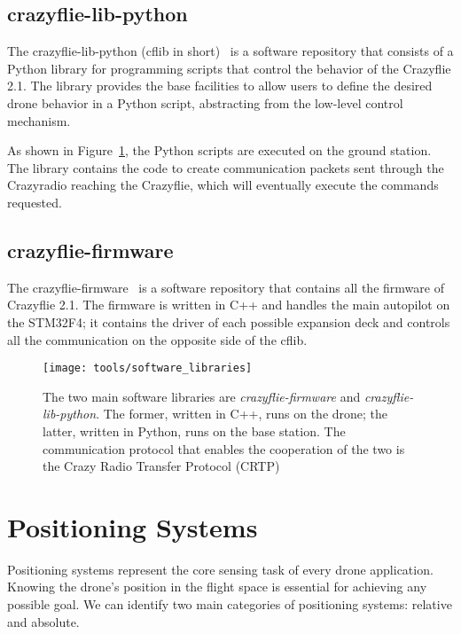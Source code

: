 \subsection{crazyflie-lib-python}\label{subsec:crazyflie_lib_python}
The crazyflie-lib-python (cflib in short)~\cite{crazyflie-lib-python} is a software repository that consists of a Python library for programming scripts that control the behavior of the Crazyflie 2.1.
The library provides the base facilities to allow users to define the desired drone behavior in a Python script, abstracting from the low-level control mechanism.

As shown in Figure~\ref{fig:software_libraries}, the Python scripts are executed on the ground station.
The library contains the code to create communication packets sent through the Crazyradio reaching the Crazyflie, which will eventually execute the commands requested. 

\subsection{crazyflie-firmware}\label{subsec:crazyflie-firmware}
The crazyflie-firmware~\cite{crazyflie-firmware} is a software repository that contains all the firmware of Crazyflie 2.1. 
The firmware is written in C++ and handles the main autopilot on the STM32F4; it contains the driver of each possible expansion deck and controls all the communication on the opposite side of the cflib.


\begin{figure}[h]
    \centering
    \texttt{[image: tools/software\_libraries]}
    \caption[Software libraries integration]{
        The two main software libraries are \textit{crazyflie-firmware} and \textit{crazyflie-lib-python}. 
        The former, written in C++, runs on the drone; the latter, written in Python, runs on the base station. 
        The communication protocol that enables the cooperation of the two is the Crazy Radio Transfer Protocol (CRTP)}\label{fig:software_libraries}
\end{figure}


\section{Positioning Systems}\label{sec:positioning_systems}
Positioning systems represent the core sensing task of every drone application. 
Knowing the drone's position in the flight space is essential for achieving any possible goal.
We can identify two main categories of positioning systems: relative and absolute. 

